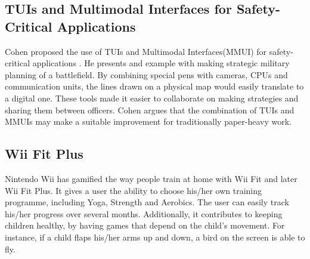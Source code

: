 \subsection{TUIs and Multimodal Interfaces for Safety-Critical Applications}
Cohen \etal{} proposed the use of TUIs and Multimodal Interfaces(MMUI) for safety-critical applications \cite{cohen2004tangible}. He presents and example with making strategic military planning of a battlefield. By combining special pens with cameras, CPUs and communication units, the lines drawn on a physical map would easily translate to a digital one. These tools made it easier to collaborate on making strategies and sharing them between officers. Cohen argues that the combination of TUIs and MMUIs may make a suitable improvement for traditionally paper-heavy work.

\subsection{Wii Fit Plus}
\label{sec:wiifitplus}
Nintendo Wii has gamified the way people train at home with Wii Fit and later Wii Fit Plus. It gives a user the ability to choose his/her own training programme, including Yoga, Strength and Aerobics. The user can easily track his/her progress over several months. Additionally, it contributes to keeping children healthy, by having games that depend on the child's movement. For instance, if a child flaps his/her arms up and down, a bird on the screen is able to fly.    
 